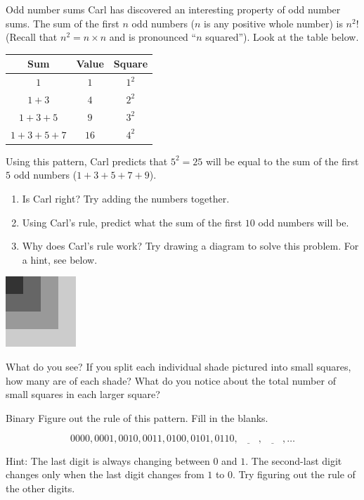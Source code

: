 \documentclass[12pt,letterpaper]{article}
\begin{document}
\begin{problem}{Odd number sums}
 Carl has discovered an interesting property of odd number sums.
 The sum of the first $n$ odd numbers ($n$ is any positive whole number) is $n^2$!
 (Recall that $n^2=n \times n$ and is pronounced ``$n$ squared'').
 Look at the table below.

 \begin{center}
  \begin{tabular}{|c|c|c|}
  \hline
   Sum & Value & Square \\
  \hline
   $1$ & $1$ & $1^2$ \\
   $1 + 3$ & $4$ & $2^2$ \\
   $1 + 3 + 5$ & $9$ & $3^2$ \\
   $1 + 3 + 5 + 7$ & $16$ & $4^2$ \\
   \hline
  \end{tabular}
 \end{center}

 Using this pattern, Carl predicts that $5^2=25$ will be equal to the sum of the first $5$ odd numbers ($1+3+5+7+9$).

 \begin{enumerate}
  \item Is Carl right? Try adding the numbers together.
  \item Using Carl's rule, predict what the sum of the first $10$ odd numbers will be.
  \item Why does Carl's rule work? Try drawing a diagram to solve this problem. For a hint, see below.
 \end{enumerate}

 \begin{center}
  \includegraphics[width=100px]{hint.png}
 \end{center}

 What do you see? If you split each individual shade pictured into small squares,
 how many are of each shade? What do you notice about the total number of small
 squares in each larger square?

\end{problem}

\begin{problem}{Binary}
 Figure out the rule of this pattern. Fill in the blanks.

 \[
  0000, 0001, 0010, 0011, 0100, 0101, 0110, \underline{\hspace{2em}}, \underline{\hspace{2em}}, \ldots
 \]

 Hint: The last digit is always changing between $0$ and $1$. The second-last digit changes only when
 the last digit changes from $1$ to $0$. Try figuring out the rule of the other digits.
\end{problem}
\end{document}
